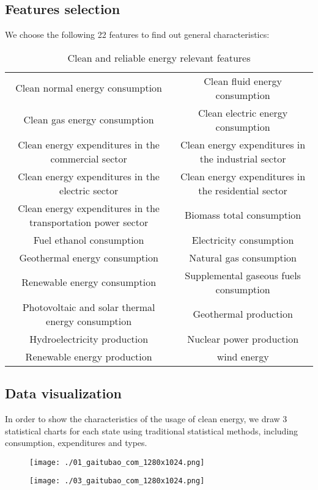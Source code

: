 \documentclass[a4paper]{article}
\begin{document}
\subsection{Features selection}

We choose the following 22 features to find out general characteristics:

\begin{table}[H]
\centering
\begin{tabular}{cc}
\midrule
Clean normal energy consumption & Clean fluid energy consumption\\
Clean gas energy consumption & Clean electric energy consumption\\
Clean energy  expenditures in the commercial sector& Clean energy expenditures in the industrial sector \\
Clean energy expenditures in the electric sector&Clean energy expenditures in the residential sector\\
Clean energy expenditures in the transportation power sector & Biomass total consumption \\
Fuel ethanol consumption & Electricity consumption \\
Geothermal energy consumption & Natural gas consumption \\
Renewable energy consumption & Supplemental gaseous fuels consumption\\
Photovoltaic and solar thermal energy consumption & Geothermal production \\
Hydroelectricity production & Nuclear power production \\
Renewable energy production &wind energy\\
\bottomrule
\end{tabular}
\caption{Clean and reliable energy relevant features}\label{tab:aStrangeTable}
\end{table}

\subsection{Data visualization}

In order to show the characteristics of the usage of clean energy, we draw 3 statistical charts for each state using traditional statistical methods, including consumption, expenditures and types.

\begin{figure}[H]
\begin{minipage}[t]{0.5\linewidth}
\centering
\texttt{[image: ./01\_gaitubao\_com\_1280x1024.png]}
\label{fig:side:a}
\end{minipage}%
\begin{minipage}[t]{0.5\linewidth}
\centering
\texttt{[image: ./03\_gaitubao\_com\_1280x1024.png]}
\label{fig:side:b}
\end{minipage}
\end{figure}
\end{document}
